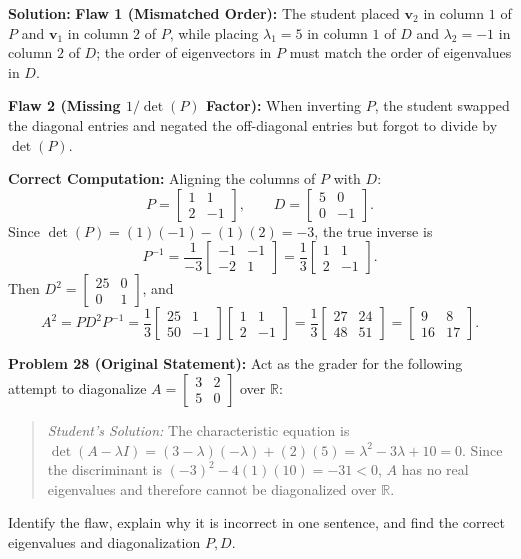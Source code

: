 \documentclass[11pt, letterpaper]{article}
\theoremstyle{definition}
\theoremstyle{remark}
\begin{document}
\textbf{Solution:}
\textbf{Flaw 1 (Mismatched Order):} The student placed $\mathbf{v}_{2}$ in column $1$ of $P$ and $\mathbf{v}_{1}$ in column $2$ of $P$, while placing $\lambda_{1} = 5$ in column $1$ of $D$ and $\lambda_{2} = -1$ in column $2$ of $D$; the order of eigenvectors in $P$ must match the order of eigenvalues in $D$.

\textbf{Flaw 2 (Missing $1/\det(P)$ Factor):} When inverting $P$, the student swapped the diagonal entries and negated the off-diagonal entries but forgot to divide by $\det(P)$.

\textbf{Correct Computation:} Aligning the columns of $P$ with $D$:
\[
P = \begin{bmatrix} 1 & 1 \\ 2 & -1 \end{bmatrix}, \qquad D = \begin{bmatrix} 5 & 0 \\ 0 & -1 \end{bmatrix}.
\]
Since $\det(P) = (1)(-1) - (1)(2) = -3$, the true inverse is
\[
P^{-1} = \frac{1}{-3}\begin{bmatrix} -1 & -1 \\ -2 & 1 \end{bmatrix} = \frac{1}{3}\begin{bmatrix} 1 & 1 \\ 2 & -1 \end{bmatrix}.
\]
Then $D^{2} = \begin{bmatrix} 25 & 0 \\ 0 & 1 \end{bmatrix}$, and
\[
A^{2} = PD^{2}P^{-1} = \frac{1}{3}\begin{bmatrix} 25 & 1 \\ 50 & -1 \end{bmatrix}\begin{bmatrix} 1 & 1 \\ 2 & -1 \end{bmatrix} = \frac{1}{3}\begin{bmatrix} 27 & 24 \\ 48 & 51 \end{bmatrix} = \begin{bmatrix} 9 & 8 \\ 16 & 17 \end{bmatrix}.
\]

\vspace{0.8em}
\textbf{Problem 28 (Original Statement):}
Act as the grader for the following attempt to diagonalize $A = \begin{bmatrix} 3 & 2 \\ 5 & 0 \end{bmatrix}$ over $\mathbb{R}$:
\begin{quote}
\emph{Student's Solution:} The characteristic equation is $\det(A - \lambda I) = (3 - \lambda)(-\lambda) + (2)(5) = \lambda^{2} - 3\lambda + 10 = 0$. Since the discriminant is $(-3)^{2} - 4(1)(10) = -31 < 0$, $A$ has no real eigenvalues and therefore cannot be diagonalized over $\mathbb{R}$.
\end{quote}
Identify the flaw, explain why it is incorrect in one sentence, and find the correct eigenvalues and diagonalization $P, D$.
\end{document}
